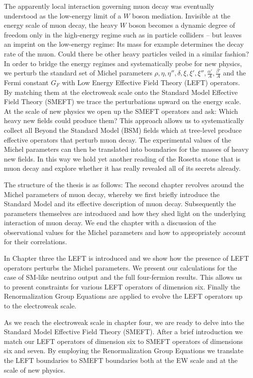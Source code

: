 The apparently local interaction governing muon decay was eventually understood as the low-energy limit of a $W$ boson mediation. Invisible at the energy scale of muon decay, the heavy $W$ boson becomes a dynamic degree of freedom only in the high-energy regime such as in particle colliders \cite{arnison1983w,banner1983w} -- but leaves an imprint on the low-energy regime: Its mass for example determines the decay rate of the muon. Could there be other heavy particles veiled in a similar fashion? In order to bridge the energy regimes and systematically probe for new physics, we perturb the standard set of Michel parameters $\rho,\eta,\eta'',\delta,\xi,\xi',\xi'',\tfrac{\alpha'}{A},\tfrac{\beta'}{A}$ and the Fermi constant $G_F$ with Low Energy Effective Field Theory (LEFT) operators. By matching them at the electroweak scale onto the Standard Model Effective Field Theory (SMEFT) we trace the perturbations upward on the energy scale. At the scale of new physics we open up the SMEFT operators and ask: Which heavy new fields could produce them? This approach allows us to systematically collect all Beyond the Standard Model (BSM) fields which at tree-level produce effective operators that perturb muon decay. The experimental values of the Michel parameters can then be translated into boundaries for the masses of heavy new fields. In this way we hold yet another reading of the Rosetta stone that is muon decay and explore whether it has really revealed all of its secrets already.

The structure of the thesis is as follows: The second chapter revolves around the Michel parameters of muon decay, whereby we first briefly introduce the Standard Model and its effective description of muon decay. Subsequently the parameters themselves are introduced and how they shed light on the underlying interaction of muon decay. We end the chapter with a discussion of the observational values for the Michel parameters and how to appropriately account for their correlations. 

In Chapter three the LEFT is introduced and we show how the presence of LEFT operators perturbs the Michel parameters. We present our calculations for the case of SM-like neutrino output and the full four-fermion results. This allows us to present constraints for various LEFT operators of dimension six. Finally the Renormalization Group Equations are applied to evolve the LEFT operators up to the electroweak scale.

As we reach the electroweak scale in chapter four, we are ready to delve into the Standard Model Effective Field Theory (SMEFT). After a brief introduction we match our LEFT operators of dimension six to SMEFT operators of dimensions six and seven. By employing the Renormalization Group Equations we translate the LEFT boundaries to SMEFT boundaries both at the EW scale and at the scale of new physics. 

